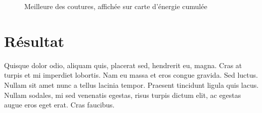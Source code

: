 \documentclass[a4paper]{article}
\begin{document}
\begin{figure}[!ht]%
    \centering
    \hspace{0.030\textwidth}
    \caption{Meilleure des coutures, affichée sur carte d'énergie cumulée}
    \label{bestseam}
\end{figure}
\section{Résultat}

Quisque dolor odio, aliquam quis, placerat sed, hendrerit eu, magna. Cras at
turpis et mi imperdiet lobortis. Nam eu massa et eros congue gravida. Sed
luctus. Nullam sit amet nunc a tellus lacinia tempor. Praesent tincidunt ligula
quis lacus. Nullam sodales, mi sed venenatis egestas, risus turpis dictum elit,
ac egestas augue eros eget erat. Cras faucibus.
\end{document}
